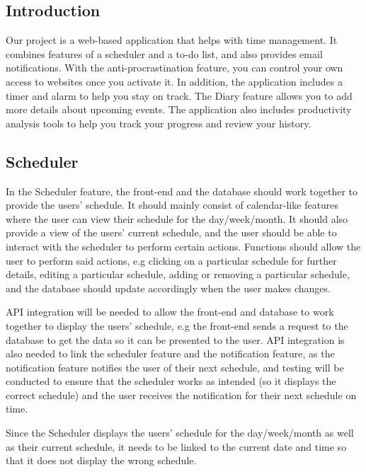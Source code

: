 \documentclass[a4paper]{article}
\begin{document}
{\small

\subsection{Introduction}

Our project is a web-based application that helps with time management. It combines features of a scheduler and a to-do list, and also provides email notifications. With the anti-procrastination feature, you can control your own access to websites once you activate it. In addition, the application includes a timer and alarm to help you stay on track. The Diary feature allows you to add more details about upcoming events. The application also includes productivity analysis tools to help you track your progress and review your history.

\subsection{Scheduler}

In the Scheduler feature, the front-end and the database should work together to provide the users’ schedule. It should mainly consist of calendar-like features where the user can view their schedule for the day/week/month. It should also provide a view of the users’ current schedule, and the user should be able to interact with the scheduler to perform certain actions. Functions should allow the user to perform said actions, e.g clicking on a particular schedule for further details, editing a particular schedule, adding or removing a particular schedule, and the database should update accordingly when the user makes changes. 

API integration will be needed to allow the front-end and database to work together to display the users’ schedule, e.g the front-end sends a request to the database to get the data so it can be presented to the user. API integration is also needed to link the scheduler feature and the notification feature, as the notification feature notifies the user of their next schedule, and testing will be conducted to ensure that the scheduler works as intended (so it displays the correct schedule) and the user receives the notification for their next schedule on time.

Since the Scheduler displays the users’ schedule for the day/week/month as well as their current schedule, it needs to be linked to the current date and time so that it does not display the wrong schedule.

}
\end{document}
